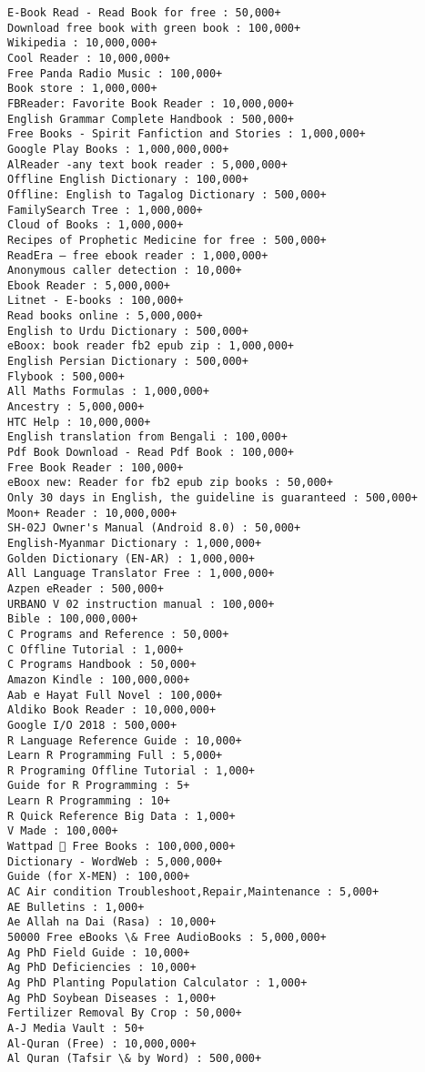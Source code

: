\documentclass[11pt]{article}
\begin{document}
    \begin{Verbatim}[commandchars=\\\{\}]
E-Book Read - Read Book for free : 50,000+
Download free book with green book : 100,000+
Wikipedia : 10,000,000+
Cool Reader : 10,000,000+
Free Panda Radio Music : 100,000+
Book store : 1,000,000+
FBReader: Favorite Book Reader : 10,000,000+
English Grammar Complete Handbook : 500,000+
Free Books - Spirit Fanfiction and Stories : 1,000,000+
Google Play Books : 1,000,000,000+
AlReader -any text book reader : 5,000,000+
Offline English Dictionary : 100,000+
Offline: English to Tagalog Dictionary : 500,000+
FamilySearch Tree : 1,000,000+
Cloud of Books : 1,000,000+
Recipes of Prophetic Medicine for free : 500,000+
ReadEra – free ebook reader : 1,000,000+
Anonymous caller detection : 10,000+
Ebook Reader : 5,000,000+
Litnet - E-books : 100,000+
Read books online : 5,000,000+
English to Urdu Dictionary : 500,000+
eBoox: book reader fb2 epub zip : 1,000,000+
English Persian Dictionary : 500,000+
Flybook : 500,000+
All Maths Formulas : 1,000,000+
Ancestry : 5,000,000+
HTC Help : 10,000,000+
English translation from Bengali : 100,000+
Pdf Book Download - Read Pdf Book : 100,000+
Free Book Reader : 100,000+
eBoox new: Reader for fb2 epub zip books : 50,000+
Only 30 days in English, the guideline is guaranteed : 500,000+
Moon+ Reader : 10,000,000+
SH-02J Owner's Manual (Android 8.0) : 50,000+
English-Myanmar Dictionary : 1,000,000+
Golden Dictionary (EN-AR) : 1,000,000+
All Language Translator Free : 1,000,000+
Azpen eReader : 500,000+
URBANO V 02 instruction manual : 100,000+
Bible : 100,000,000+
C Programs and Reference : 50,000+
C Offline Tutorial : 1,000+
C Programs Handbook : 50,000+
Amazon Kindle : 100,000,000+
Aab e Hayat Full Novel : 100,000+
Aldiko Book Reader : 10,000,000+
Google I/O 2018 : 500,000+
R Language Reference Guide : 10,000+
Learn R Programming Full : 5,000+
R Programing Offline Tutorial : 1,000+
Guide for R Programming : 5+
Learn R Programming : 10+
R Quick Reference Big Data : 1,000+
V Made : 100,000+
Wattpad 📖 Free Books : 100,000,000+
Dictionary - WordWeb : 5,000,000+
Guide (for X-MEN) : 100,000+
AC Air condition Troubleshoot,Repair,Maintenance : 5,000+
AE Bulletins : 1,000+
Ae Allah na Dai (Rasa) : 10,000+
50000 Free eBooks \& Free AudioBooks : 5,000,000+
Ag PhD Field Guide : 10,000+
Ag PhD Deficiencies : 10,000+
Ag PhD Planting Population Calculator : 1,000+
Ag PhD Soybean Diseases : 1,000+
Fertilizer Removal By Crop : 50,000+
A-J Media Vault : 50+
Al-Quran (Free) : 10,000,000+
Al Quran (Tafsir \& by Word) : 500,000+

\end{Verbatim}
\end{document}
